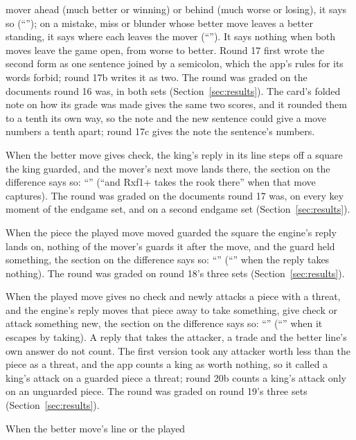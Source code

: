 \documentclass[11pt]{article}
\begin{document}
\begin{description}[style=nextline, nosep]
mover ahead (much better or winning) or behind (much worse or losing), it says so
(``\RoundSeventeenQuoteBehind''); on a mistake, miss or blunder whose better move leaves a better
standing, it says where each leaves the mover (``\RoundSeventeenQuoteCrossing''). It says nothing
when both moves leave the game open, from worse to better. Round 17 first wrote the second form as
one sentence joined by a semicolon, which the app's rules for its words forbid; round 17b writes it
as two. The round was graded on the documents round 16 was, in both sets
(Section~\ref{sec:results}). The card's folded note on how its grade was made gives the same two
scores, and it rounded them to a tenth its own way, so the note and the new sentence could give a
move numbers a tenth apart; round 17c gives the note the sentence's numbers.
\item[Round 18: a check with a reason.] When the better move gives check, the king's reply in its
line steps off a square the king guarded, and the mover's next move lands there, the section on the
difference says so: ``\RoundEighteenQuote'' (``and Rxf1+ takes the rook there'' when that move
captures). The round was graded on the documents round 17 was, on every key moment of the endgame
set, and on a second endgame set (Section~\ref{sec:results}).
\item[Round 19: the guard a played move gives up.] When the piece the played move moved guarded the
square the engine's reply lands on, nothing of the mover's guards it after the move, and the guard
held something, the section on the difference says so: ``\RoundNineteenQuote'' (``\RoundNineteenQuoteKing''
when the reply takes nothing). The round was graded on round 18's three sets
(Section~\ref{sec:results}).
\item[Round 20: the chased piece that escapes.] When the played move gives no check and newly
attacks a piece with a threat, and the engine's reply moves that piece away to take something,
give check or attack something new, the section on the difference says so: ``\RoundTwentyQuote''
(``\RoundTwentyQuoteTakes'' when it escapes by taking). A reply that takes the attacker, a trade
and the better line's own answer do not count. The first version took any attacker worth less than
the piece as a threat, and the app counts a king as worth nothing, so it called a king's attack on
a guarded piece a threat; round 20b counts a king's attack only on an unguarded piece. The round
was graded on round 19's three sets (Section~\ref{sec:results}).
\item[Round 21: the pawn ending a trade leads to.] When the better move's line or the played

\end{description}
\end{document}
